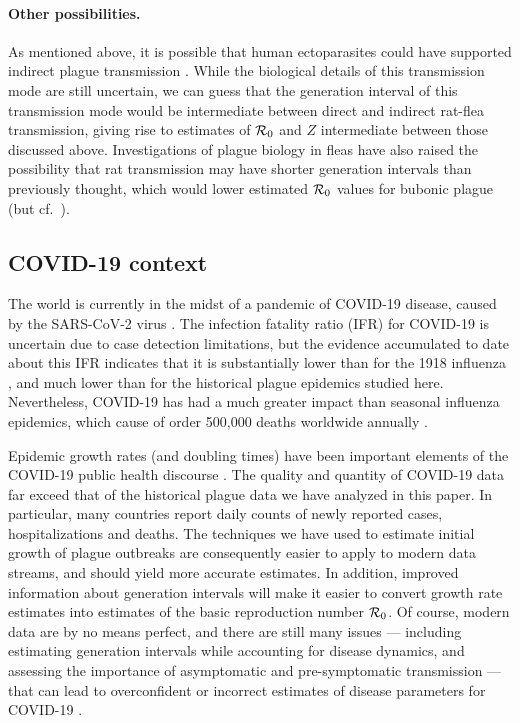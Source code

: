 \paragraph{Other possibilities.}

As mentioned above, it is possible that human ectoparasites could have supported indirect plague transmission \cite{Dean+18,Laro+18}. While the biological details of this transmission mode are still uncertain, we can guess that the generation interval of this transmission mode would be intermediate between direct and indirect rat-flea transmission, giving rise to estimates of ${\mathcal R}_0$ and $Z$ intermediate between those discussed above. Investigations of plague biology in fleas have also raised the possibility that rat transmission may have shorter generation intervals than previously thought, which would lower estimated ${\mathcal R}_0$ values for bubonic plague \cite{Eise+06,Eise+07} (but cf.~\cite{Hinn+17}).

\subsection*{COVID-19 context}

The world is currently in the midst of a pandemic of COVID-19 disease, caused by  the SARS-CoV-2 virus \cite{WHO2020March11}. The infection fatality ratio (IFR) for COVID-19 is uncertain due to case detection limitations, but the evidence accumulated to date about this IFR \cite{MeyeLea2020,Basu2020} indicates that it is substantially lower than for the 1918 influenza \cite{Earn+02,JohnMuel02}, and much lower than for the historical plague epidemics studied here. Nevertheless, COVID-19 has had a much greater impact than seasonal influenza epidemics, which cause of order 500,000 deaths worldwide annually \cite{Earn+02,Dush+06}.

Epidemic growth rates (and doubling times) have been important elements of the COVID-19 public health discourse \cite{Park+2020}.  The quality and quantity of COVID-19 data far exceed that of the historical plague data we have analyzed in this paper.  In particular, many countries report daily counts of newly reported cases, hospitalizations and deaths. The techniques we have used to estimate initial growth of plague outbreaks are consequently easier to apply to modern data streams, and should yield more accurate estimates.  In addition, improved information about generation intervals will make it easier to convert growth rate estimates into estimates of the basic reproduction number ${\mathcal R}_0$.  Of course, modern data are by no means perfect, and there are still many issues --- including estimating generation intervals while accounting for disease dynamics, and assessing the importance of asymptomatic and pre-symptomatic transmission --- that can lead to overconfident or incorrect estimates of disease parameters for COVID-19 \cite{Park+2020,Park+20b,Park+20c}.


